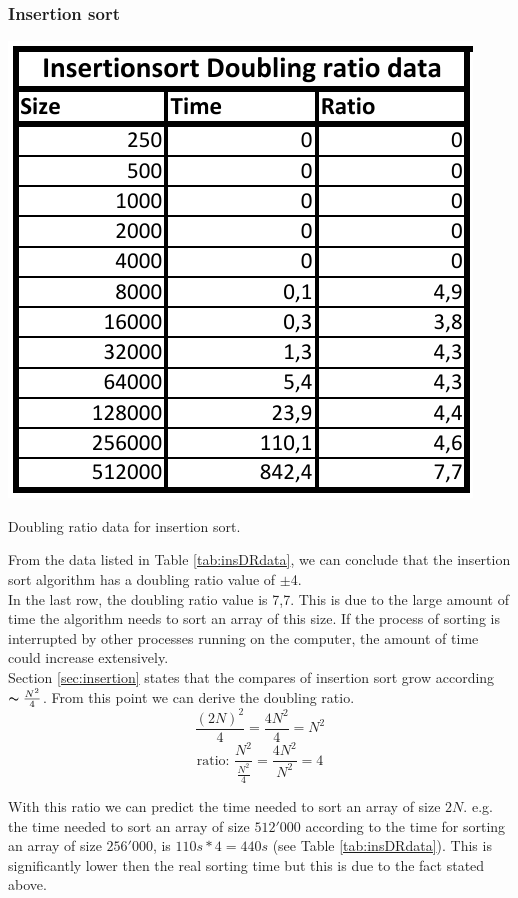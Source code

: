 \documentclass[pdftex,11pt,a4paper,english,titlepage]{article}
\begin{document}
		\subsubsection{Insertion sort}\label{sec:insDR}
\begin{table}[H]
	\centering
	\includegraphics[scale=1]{insertionDRdata.pdf}
	\caption{Doubling ratio data for insertion sort.\label{tab:insDRdata}}
\end{table}

From the data listed in Table \ref{tab:insDRdata}, we can conclude that the insertion sort algorithm has a doubling ratio value of $\pm$4.\\
In the last row, the doubling ratio value is 7,7. This is due to the large amount of time the algorithm needs to sort an array of this size. If the process of sorting is interrupted by other processes running on the computer, the amount of time could increase extensively.\\

Section \ref{sec:insertion} states that the compares of insertion sort grow according $\thicksim\frac{N^2}{4}$. From this point we can derive the doubling ratio. $$\frac{(2N)^2}{4}=\frac{4N^2}{4}=N^2$$
$$\text{ratio: } \frac{N^2}{\frac{N^2}{4}}=\frac{4N^2}{N^2}=4$$

With this ratio we can predict the time needed to sort an array of size $2N$. e.g. the time needed to sort an array of size $512'000$ according to the time for sorting an array of size $256'000$, is $110s*4 = 440s$ (see Table \ref{tab:insDRdata}). This is significantly lower then the real sorting time but this is due to the fact stated above.
\end{document}
